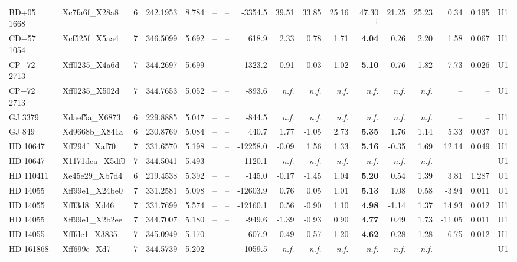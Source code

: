 \begin{tabular}{@{}l@{~}l@{~}c@{~}r@{~}r@{~}c@{~}l@{~}r@{~~}r@{~}r@{~}r@{~~}r@{~}r@{~}r@{~~}r@{~}r@{~}l@{}}
BD+05 1668 & Xc7fa6f\_X28a8 & 6 & 242.1953 & 8.784 & -- & -- & -3354.5 & 39.51 & 33.85 & 25.16 & 47.30$^{\dagger}$ & 21.25 & 25.23 & 0.34 & 0.195 & U1 \\
CD$-$57 1054 & Xcf525f\_X5aa4 & 7 & 346.5099 & 5.692 & -- & -- & 618.9 & 2.33 & 0.78 & 1.71 & \textbf{4.04} & 0.26 & 2.20 & 1.58 & 0.067 & U1 \\
CP$-$72 2713 & Xff0235\_X4a6d & 7 & 344.2697 & 5.699 & -- & -- & -1323.2 & -0.91 & 0.03 & 1.02 & \textbf{5.10} & 0.76 & 1.82 & -7.73 & 0.026 & U1 \\
CP$-$72 2713 & Xff0235\_X502d & 7 & 344.7653 & 5.052 & -- & -- & -893.6 & \emph{n.f.} & \emph{n.f.} & \emph{n.f.} & \emph{n.f.} & \emph{n.f.} & \emph{n.f.} & -- & -- & U1 \\
GJ 3379 & Xdaef5a\_X6873 & 6 & 229.8885 & 5.047 & -- & -- & -844.5 & \emph{n.f.} & \emph{n.f.} & \emph{n.f.} & \emph{n.f.} & \emph{n.f.} & \emph{n.f.} & -- & -- & U1 \\
GJ 849 & Xd9668b\_X841a & 6 & 230.8769 & 5.084 & -- & -- & 440.7 & 1.77 & -1.05 & 2.73 & \textbf{5.35} & 1.76 & 1.14 & 5.33 & 0.037 & U1 \\
HD 10647 & Xff294f\_Xaf70 & 7 & 331.6570 & 5.198 & -- & -- & -12258.0 & -0.09 & 1.56 & 1.33 & \textbf{5.16} & -0.35 & 1.69 & 12.14 & 0.049 & U1 \\
HD 10647 & X1171dca\_X5df0 & 7 & 344.5041 & 5.493 & -- & -- & -1120.1 & \emph{n.f.} & \emph{n.f.} & \emph{n.f.} & \emph{n.f.} & \emph{n.f.} & \emph{n.f.} & -- & -- & U1 \\
HD 110411 & Xe45e29\_Xb7d4 & 6 & 219.4538 & 5.392 & -- & -- & -145.0 & -0.17 & -1.45 & 1.04 & \textbf{5.20} & 0.54 & 1.39 & 3.81 & 1.287 & U1 \\
HD 14055 & Xff99e1\_X24be0 & 7 & 331.2581 & 5.098 & -- & -- & -12603.9 & 0.76 & 0.05 & 1.01 & \textbf{5.13} & 1.08 & 0.58 & -3.94 & 0.011 & U1 \\
HD 14055 & Xfff3d8\_Xd46 & 7 & 331.7699 & 5.574 & -- & -- & -12160.1 & 0.56 & -0.90 & 1.10 & \textbf{4.98} & -1.14 & 1.37 & 14.93 & 0.012 & U1 \\
HD 14055 & Xff99e1\_X2b2ee & 7 & 344.7007 & 5.180 & -- & -- & -949.6 & -1.39 & -0.93 & 0.90 & \textbf{4.77} & 0.49 & 1.73 & -11.05 & 0.011 & U1 \\
HD 14055 & Xfffde1\_X3835 & 7 & 345.0949 & 5.170 & -- & -- & -607.9 & -0.49 & 0.57 & 1.20 & \textbf{4.62} & -0.28 & 1.28 & 6.75 & 0.012 & U1 \\
HD 161868 & Xff699e\_Xd7 & 7 & 344.5739 & 5.202 & -- & -- & -1059.5 & \emph{n.f.} & \emph{n.f.} & \emph{n.f.} & \emph{n.f.} & \emph{n.f.} & \emph{n.f.} & -- & -- & U1 \\

\end{tabular}
